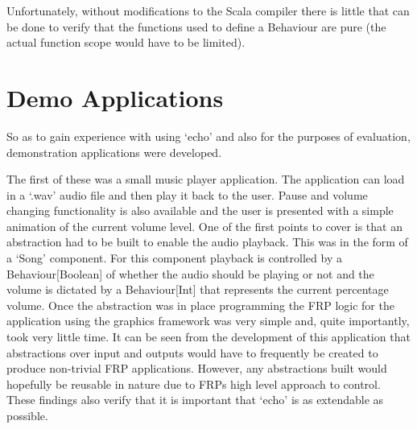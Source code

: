     Unfortunately, without modifications to the Scala compiler there is little that can be done
    to verify that the functions used to define a Behaviour are pure (the actual function scope would
    have to be limited).
  
  \section{Demo Applications}
    So as to gain experience with using `echo' and also for the purposes of evaluation, demonstration
    applications were developed. 
    
    The first of these was a small music player application. The application
    can load in a `.wav' audio file and then play it back to the user. Pause and volume changing functionality
    is also available and the user is presented with a simple animation of the current volume level. One of the
    first points to cover is that an abstraction had to be built to enable the audio playback. This was in the form
    of a `Song' component. For this component playback is controlled by a Behaviour[Boolean] of whether the audio
    should be playing or not and the volume is dictated by a Behaviour[Int] that represents the current percentage
    volume. Once the abstraction was in place programming the FRP logic for the application using the 
    graphics framework was very simple and, quite importantly, took very little time. It can be seen from
    the development of this application that abstractions over input and outputs would have to frequently be
    created to produce non-trivial FRP applications. However, any abstractions built would hopefully be
    reusable in nature due to FRPs high level approach to control. These findings also verify that it
    is important that `echo' is as extendable as possible.